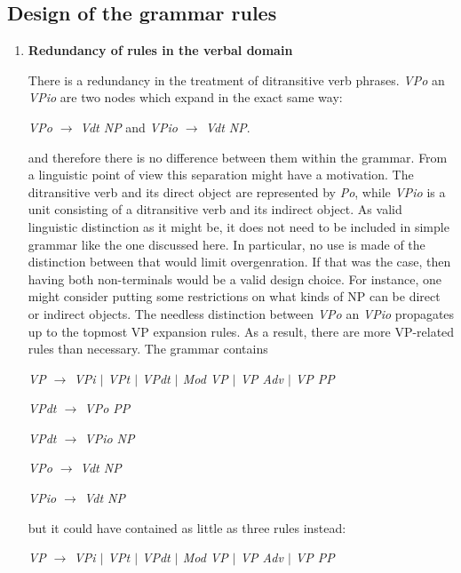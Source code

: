 \documentclass{article}
\begin{document}
	\subsection{Design of the grammar rules}
		\begin{enumerate}
		\item
		\textbf{Redundancy of rules in the verbal domain}
		
		There is a redundancy in the treatment of ditransitive verb phrases. \emph{VPo} an \emph{VPio} are two nodes which expand in the exact same way:
		\begin{center}
			
			\emph{VPo $\rightarrow$ Vdt NP} and \emph{VPio $\rightarrow$ Vdt NP}.
			
		\end{center}
		and therefore there is no difference between them within the grammar. From a linguistic point of view this separation might have a motivation. The ditransitive verb and its direct object are represented by \emph{Po}, while \emph{VPio} is a unit consisting of a ditransitive verb and its indirect object. As valid linguistic distinction as it might be, it does not need to be included in simple grammar like the one discussed here. In particular, no use is made of the distinction between that would limit overgenration. If that was the case, then having both non-terminals would be a valid design choice. For instance, one might consider putting some restrictions on what kinds of NP can be direct or indirect objects.
		The needless distinction between \emph{VPo} an \emph{VPio} propagates up to the topmost VP expansion rules. As a result, there are more VP-related rules than necessary. The grammar contains
		\begin{center}
			
			\emph{VP $\rightarrow$ VPi $\vert$ VPt $\vert$ VPdt $\vert$ Mod VP $\vert$ VP Adv $\vert$ VP PP}
			
			\emph{VPdt $\rightarrow$ VPo PP}
			
			\emph{VPdt $\rightarrow$ VPio NP}
			
			\emph{VPo $\rightarrow$ Vdt NP}
			
			\emph{VPio $\rightarrow$ Vdt NP}
			
		\end{center}
		but it could have contained as little as three rules instead:
		
		\begin{center}
			
			\emph{VP $\rightarrow$ VPi $\vert$ VPt $\vert$ VPdt $\vert$ Mod VP $\vert$ VP Adv $\vert$ VP PP}
			

\end{center}
\end{enumerate}
\end{document}
